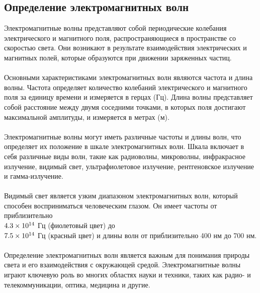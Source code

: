 \documentclass{article}
\begin{document}
\subsection{Определение электромагнитных волн}
Электромагнитные волны представляют собой периодические колебания электрического и магнитного поля, распространяющиеся в пространстве со скоростью света. Они возникают в результате взаимодействия электрических и магнитных полей, которые образуются при движении заряженных частиц.\\
~\\
Основными характеристиками электромагнитных волн являются частота и длина волны. Частота определяет количество колебаний электрического и магнитного поля за единицу времени и измеряется в герцах (Гц). Длина волны представляет собой расстояние между двумя соседними точками, в которых поля достигают максимальной амплитуды, и измеряется в метрах (м).\\
~\\
Электромагнитные волны могут иметь различные частоты и длины волн, что определяет их положение в шкале электромагнитных волн. Шкала включает в себя различные виды волн, такие как радиоволны, микроволны, инфракрасное излучение, видимый свет, ультрафиолетовое излучение, рентгеновское излучение и гамма-излучение.\\
~\\
Видимый свет является узким диапазоном электромагнитных волн, который способен восприниматься человеческим глазом. Он имеет частоты от приблизительно \\$4.3 \times 10^{14}\\$ Гц (фиолетовый цвет) до \\$7.5 \times 10^{14}\\$ Гц (красный цвет) и длины волн от приблизительно 400 нм до 700 нм.\\
~\\
Определение электромагнитных волн является важным для понимания природы света и его взаимодействия с окружающей средой. Электромагнитные волны играют ключевую роль во многих областях науки и техники, таких как радио- и телекоммуникации, оптика, медицина и другие.
\end{document}
